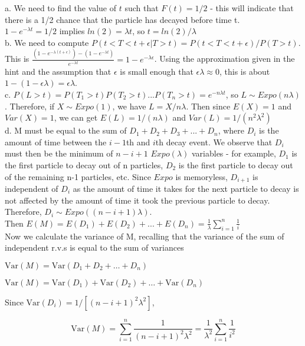 a. We need to find the value of \(t\) such that \(F(t) = 1/2\) - this will indicate that there is a 1/2 chance that the particle has decayed before time t.\\

\(1-e^{-\lambda t} = 1/2\) implies \(ln(2) = \lambda t\), so \(t = ln(2)/\lambda\)\\

b. We need to compute \(P(t < T < t+\epsilon | T > t) = P(t < T < t+\epsilon)/ P(T > t)\). This is \(\frac{(1-e^{-\lambda(t+\epsilon)})-(1-e^{-\lambda t})}{e^{-\lambda t}} = 1 - e^{-\lambda\epsilon}\). Using the approximation given in the hint and the assumption that \(\epsilon\) is small enough that \(\epsilon\lambda \approx 0\), this is about \(1-(1-\epsilon\lambda) = \epsilon\lambda\).\\

c. \(P(L > t) = P(T_{1}>t)P(T_{2}>t)...P(T_{n}>t) = e^{-n\lambda t}\), so \(L \sim Expo(n\lambda)\). Therefore, if \(X \sim Expo(1)\), we have \(L = X/n\lambda\). Then since \(E(X) = 1\) and \(Var(X)=1\), we can get \(E(L) = 1/(n\lambda)\) and \(Var(L) = 1/(n^{2}\lambda^{2})\)\\

d. M must be equal to the sum of \(D_{1} + D_{2} + D_{3} +...+D_{n}\), where \(D_{i}\) is the amount of time between the \(i-1\)th and \(i\)th decay event. We observe that \(D_{i}\) must then be the minimum of \(n-i+1\) \(Expo(\lambda)\) variables - for example, \(D_{1}\) is the first particle to decay out of n particles, \(D_{2}\) is the first particle to decay out of the remaining n-1 particles, etc. Since \(Expo\) is memoryless, \(D_{i+1}\) is independent of \(D_{i}\) as the amount of time it takes for the next particle to decay is not affected by the amount of time it took the previous particle to decay. Therefore, \(D_{i} \sim Expo((n-i+1)\lambda)\).\\

Then \(E(M) = E(D_{1}) + E(D_{2}) +... +E(D_{n}) = \frac{1}{\lambda} \sum_{i=1}^{n} \frac{1}{i} \) \\

Now we calculate the variance of M, recalling that the variance of the sum of independent r.v.s is equal to the sum of variances

\(\mathrm{Var}(M) = \mathrm{Var}(D_1 + D_2 + \dots + D_n)\)

\(\mathrm{Var}(M) = \mathrm{Var}(D_1) + \mathrm{Var}(D_2) + \dots + \mathrm{Var}(D_n)\)

Since \(\mathrm{Var}(D_i) = 1 / [ (n-i+1)^2 \lambda^2 ]\),

\[
    \mathrm{Var}(M) = \sum_{i=1}^n \frac{1}{(n-i+1)^2 \lambda^2} = \frac{1}{\lambda^2} \sum_{i=1}^n \frac{1}{i^2}
\]
